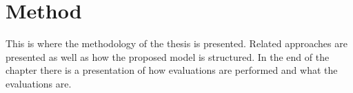 \chapter{Method}
\label{chapter:method}
This is where the methodology of the thesis is presented. Related approaches are presented as well as how the proposed model is structured. In the end of the chapter there is a presentation of how evaluations are performed and what the evaluations are.  







